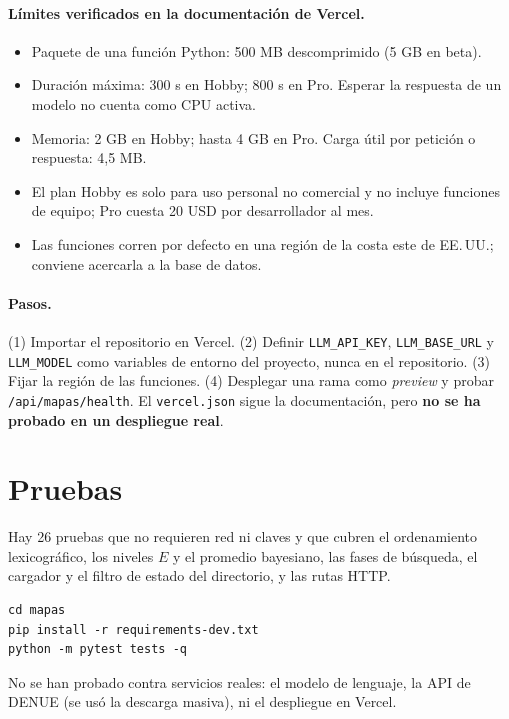 \documentclass[11pt,a4paper]{article}
\newcommand{\code}[1]{\texttt{#1}}
\begin{document}
\paragraph{Límites verificados en la documentación de Vercel.}
\begin{itemize}[nosep]
  \item Paquete de una función Python: 500 MB descomprimido (5 GB en beta).
  \item Duración máxima: 300 s en Hobby; 800 s en Pro. Esperar la respuesta de un modelo no cuenta como CPU activa.
  \item Memoria: 2 GB en Hobby; hasta 4 GB en Pro. Carga útil por petición o respuesta: 4,5 MB.
  \item El plan Hobby es solo para uso personal no comercial y no incluye funciones de equipo; Pro cuesta 20 USD por desarrollador al mes.
  \item Las funciones corren por defecto en una región de la costa este de EE.\,UU.; conviene acercarla a la base de datos.
\end{itemize}

\paragraph{Pasos.} (1) Importar el repositorio en Vercel. (2) Definir \code{LLM\_API\_KEY},
\code{LLM\_BASE\_URL} y \code{LLM\_MODEL} como variables de entorno del proyecto, nunca en el
repositorio. (3) Fijar la región de las funciones. (4) Desplegar una rama como \emph{preview} y
probar \code{/api/mapas/health}. El \code{vercel.json} sigue la documentación, pero
\textbf{no se ha probado en un despliegue real}.

\section{Pruebas}

Hay 26 pruebas que no requieren red ni claves y que cubren el ordenamiento lexicográfico, los niveles
$E$ y el promedio bayesiano, las fases de búsqueda, el cargador y el filtro de estado del directorio,
y las rutas HTTP.

\begin{lstlisting}
cd mapas
pip install -r requirements-dev.txt
python -m pytest tests -q
\end{lstlisting}

No se han probado contra servicios reales: el modelo de lenguaje, la API de DENUE (se usó la descarga
masiva), ni el despliegue en Vercel.
\end{document}

